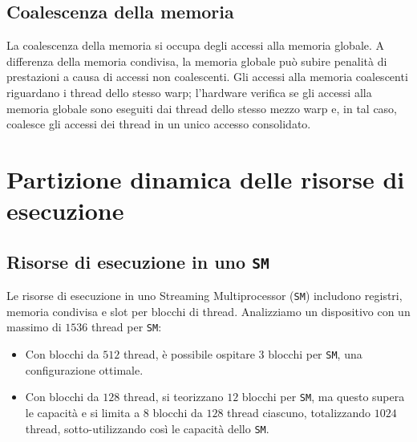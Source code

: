\subsection{Coalescenza della memoria}
La coalescenza della memoria si occupa degli accessi alla memoria globale.
A differenza della memoria condivisa, la memoria globale può subire penalità
di prestazioni a causa di accessi non coalescenti. Gli accessi alla memoria
coalescenti riguardano i thread dello stesso warp; l'hardware verifica se gli
accessi alla memoria globale sono eseguiti dai thread dello stesso mezzo warp
e, in tal caso, coalesce gli accessi dei thread in un unico accesso consolidato.

\section{Partizione dinamica delle risorse di esecuzione}
\subsection{Risorse di esecuzione in uno \texttt{SM}}
Le risorse di esecuzione in uno Streaming Multiprocessor (\texttt{SM}) includono
registri, memoria condivisa e slot per blocchi di thread. Analizziamo un
dispositivo con un massimo di $1536$ thread per \texttt{SM}:
\begin{itemize}
  \item Con blocchi da $512$ thread, è possibile ospitare 3 blocchi per \texttt{SM},
  una configurazione ottimale.
  \item Con blocchi da $128$ thread, si teorizzano $12$ blocchi per \texttt{SM}, ma questo
  supera le capacità e si limita a $8$ blocchi da $128$ thread ciascuno, totalizzando
  $1024$ thread, sotto-utilizzando così le capacità dello \texttt{SM}.
\end{itemize}

